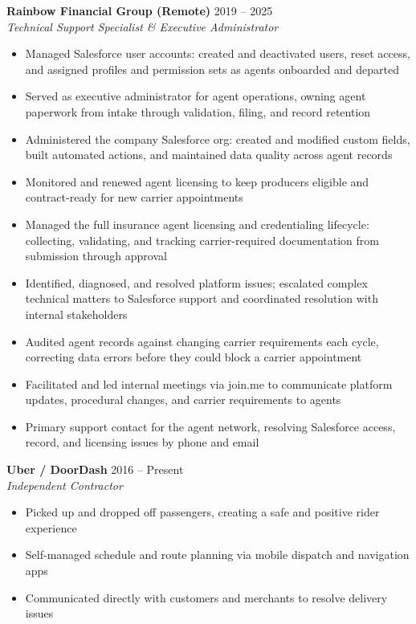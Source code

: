 \documentclass[letterpaper,10.5pt]{article}
\newcommand{\role}[3]{%
  \vspace{3pt}%
  \textbf{#1} \hfill {\small #3}\\[1pt]%
  {\small\itshape #2}\vspace{-2pt}%
}
\begin{document}
\role{Rainbow Financial Group (Remote)}{Technical Support Specialist \& Executive
Administrator}{2019 -- 2025}
\begin{itemize}
  \item Managed Salesforce user accounts: created and deactivated users, reset access, and assigned
        profiles and permission sets as agents onboarded and departed
  \item Served as executive administrator for agent operations, owning agent paperwork from intake
        through validation, filing, and record retention
  \item Administered the company Salesforce org: created and modified custom fields, built
        automated actions, and maintained data quality across agent records
  \item Monitored and renewed agent licensing to keep producers eligible and contract-ready for new
        carrier appointments
  \item Managed the full insurance agent licensing and credentialing lifecycle: collecting,
        validating, and tracking carrier-required documentation from submission through approval
  \item Identified, diagnosed, and resolved platform issues; escalated complex technical matters to
        Salesforce support and coordinated resolution with internal stakeholders
  \item Audited agent records against changing carrier requirements each cycle, correcting data
        errors before they could block a carrier appointment
  \item Facilitated and led internal meetings via join.me to communicate platform updates,
        procedural changes, and carrier requirements to agents
  \item Primary support contact for the agent network, resolving Salesforce access, record, and
        licensing issues by phone and email
\end{itemize}

\role{Uber / DoorDash}{Independent Contractor}{2016 -- Present}
\begin{itemize}
  \item Picked up and dropped off passengers, creating a safe and positive rider experience
  \item Self-managed schedule and route planning via mobile dispatch and navigation apps
  \item Communicated directly with customers and merchants to resolve delivery issues
\end{itemize}
\end{document}
